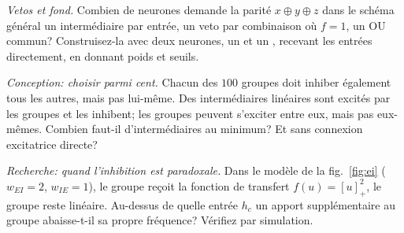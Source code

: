 \begin{exercise}[\lvlB]
\label{ex:03:6}
\emph{Vetos et fond.} Combien de neurones demande la parité $x\oplus y\oplus z$ dans le schéma général \og un intermédiaire  par entrée, un veto par combinaison où $f=1$, un OU commun\fg? Construisez-la avec deux neurones, un  et un , recevant les entrées directement, en donnant poids et seuils.
\end{exercise}

\begin{exercise}[\lvlC]
\label{ex:03:7}
\emph{Conception: choisir parmi cent.} Chacun des $100$ groupes  doit inhiber également tous les autres, mais pas lui-même. Des intermédiaires  linéaires sont excités par les groupes et les inhibent; les groupes peuvent s'exciter entre eux, mais pas eux-mêmes. Combien faut-il d'intermédiaires au minimum? Et sans connexion excitatrice directe?
\end{exercise}

\begin{exercise}[\lvlC]
\label{ex:03:8}
\emph{Recherche: quand l'inhibition est paradoxale.} Dans le modèle de la fig.~\ref{fig:ei} ($w_{EI}=2$, $w_{IE}=1$), le groupe  reçoit la fonction de transfert $f(u)=[u]_+^2$, le groupe  reste linéaire. Au-dessus de quelle entrée $h_c$ un apport supplémentaire au groupe  abaisse-t-il sa propre fréquence? Vérifiez par simulation.
\end{exercise}
